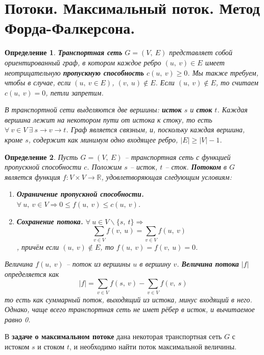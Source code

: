 \documentclass[a4paper,12pt]{article}
\newtheorem*{definition}{Определение}
\newcommand{\R}{\mathbb{R}}
\begin{document}
\newpage
\section{Потоки. Максимальный поток. Метод Форда-Фалкерсона.}

\begin{definition}
    \textbf{Транспортная сеть} $G = (V,\ E)$ представляет собой ориентированный граф, в котором каждое ребро $(u,\ v) \in E$ имеет неотрицательную \textbf{пропускную способность} $c(u,\ v) \geqslant 0$. Мы также требуем, чтобы в случае, если $(u,\ v \in E)$, $(v,\ u) \notin E$. Если $(u,\ v) \notin E$, то считаем $c(u,\ v) = 0$, петли запретим.
    
    В транспортной сети выделяются две вершины: \textbf{исток} $s$ и \textbf{сток} $t$. Каждая вершина лежит на некотором пути от истока к стоку, то есть $\forall\ v \in V\ \exists\ s \to v \to t$. Граф является связным, и, поскольку каждая вершина, кроме $s$, содержит как минимум одно входящее ребро, $|E|\geqslant|V| - 1$.
\end{definition}

\begin{definition}
    Пусть $G = (V,\ E)$ -- транспортная сеть с функцией пропускной способности $c$. Положим $s$ -- исток, $t$ -- сток. \textbf{Потоком} в $G$ является функция $f : V \times V \to \R$, удовлетворяющая следующим условиям:
    \begin{enumerate}
        \item \textbf{Ограничение пропускной способности.} $\forall\ u,\ v \in V \Rightarrow 0 \leqslant f(u,\ v) \leqslant c(u,\ v)$.
        \item \textbf{Сохранение потока.} $\forall\ u \in V\backslash \{s,\ t\} \Rightarrow$ \[\sum\limits_{v \in V}f(v,\ u) = \sum\limits_{v \in V}f(u,\ v)\], причём если $(u,\ v) \notin E$, то $f(u,\ v) = f(v,\ u) = 0$.
    \end{enumerate}
    
    Величина $f(u,\ v)$ -- поток из вершины $u$ в вершину $v$. \textbf{Величина потока} $|f|$ определяется как \[|f| = \sum\limits_{v \in V}f(s,\ v) - \sum\limits_{v \in V}f(v,\ s)\] то есть как суммарный поток, выходящий из истока, минус входящий в него. Однако, чаще всего транспортная сеть не имет рёбер в исток, и вычитаемое равно 0.
\end{definition}

В \textbf{задаче о максимальном потоке} дана некоторая транспортная сеть $G$ с истоком $s$ и стоком $t$, и необходимо найти поток максимальной величины.
\end{document}
